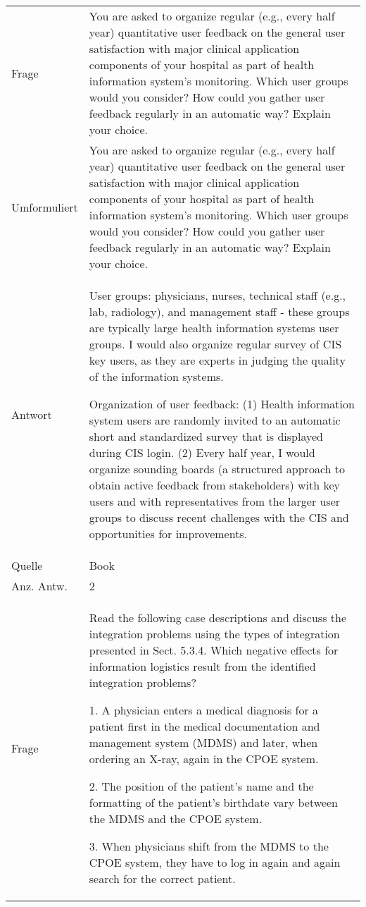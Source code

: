 \begin{landscape}
\begin{longtable}{p{3cm}p{}}
    \midrule
    Frage & You are asked to organize regular (e.g., every half year) quantitative user feedback on the general user satisfaction with major clinical application components of your hospital as part of health information system's monitoring.
    Which user groups would you consider? How could you gather user feedback regularly in an automatic way? Explain your choice.\\
    Umformuliert & You are asked to organize regular (e.g., every half year) quantitative user feedback on the general user satisfaction with major clinical application components of your hospital as part of health information system's monitoring.
    Which user groups would you consider? How could you gather user feedback regularly in an automatic way? Explain your choice.\\
    Antwort & User groups: physicians, nurses, technical staff (e.g., lab, radiology), and management staff - these groups are typically large health information systems user groups. I would also organize regular survey of CIS key users, as they are experts in judging the quality of the information systems.

    Organization of user feedback: (1) Health information system users are randomly invited to an automatic short and standardized survey that is displayed during CIS login.
    (2) Every half year, I would organize sounding boards (a structured approach to obtain active feedback from stakeholders) with key users and with representatives from the larger user groups to discuss recent challenges with the CIS and opportunities for improvements.\\
    Quelle & Book \\
    Anz. Antw. & 2 \\
    \midrule
    Frage & Read the following case descriptions and discuss the integration problems using the types of integration presented in Sect. 5.3.4. Which negative effects for information logistics result from the identified integration problems?

    1. A physician enters a medical diagnosis for a patient first in the medical documentation and management system (MDMS) and later, when ordering an X-ray, again in the CPOE system.

    2. The position of the patient's name and the formatting of the patient's birthdate vary between the MDMS and the CPOE system.

    3. When physicians shift from the MDMS to the CPOE system, they have to log in again and again search for the correct patient.


\end{longtable}
\end{landscape}
